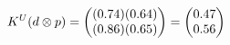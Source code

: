 \documentclass[preview]{standalone}
\begin{document}
\begin{align*}
\special{dvisvgm:raw <g id='unique000'>}K^U(d \otimes p) = \begin{pmatrix} (0.74)(0.64) \\ (0.86)(0.65) \end{pmatrix} = \begin{pmatrix} 0.47 \\ 0.56 \end{pmatrix}\special{dvisvgm:raw </g>}
\end{align*}
\end{document}
